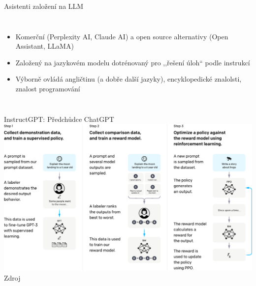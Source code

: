 \documentclass[aspectratio=169,dvipsnames]{beamer}
\begin{document}
\begin{frame}{Asistenti založení na LLM}
\begin{columns}
\begin{itemize}[<+->]
		\item Komerční (Perplexity AI, Claude AI) a open source alternativy (Open Assistant, LLaMA)

        \item Založený na jazykovém modelu dotrénovaný pro ,,řešení úloh`` podle instrukcí

        \item Výborně ovládá angličtinu (a dobře další jazyky), encyklopedické
            znalolsti, znalost programování

    \end{itemize}

    \end{columns}

\end{frame}


\begin{frame}{InstructGPT: Předchůdce ChatGPT}
    \centering
    \includegraphics[width=.8\textwidth]{img/instructgpt.pdf} \\
    \tiny Zdroj \citet[Figure 2]{ouyang2022instruct}
\end{frame}

\end{document}
